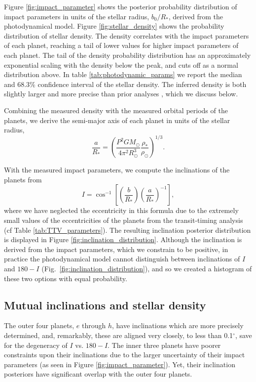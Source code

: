 \documentclass[twocolumn]{aastex63}
\begin{document}
Figure \ref{fig:impact_parameter} shows the posterior probability distribution of impact
parameters in units of the stellar radius, $b_0/R_*$, derived from the photodynamical 
model.  Figure \ref{fig:stellar_density} shows the probability distribution of stellar 
density.  The density correlates with the impact
parameters of each planet, reaching a tail of lower values
for higher impact parameters of each planet.  The tail of the density probability
distribution has an approximately exponential scaling with the density below the
peak, and cuts off as a normal distribution above.  In table \ref{tab:photodynamic_params} 
we report the median and 68.3\% confidence interval
of the stellar density.  The inferred density is both slightly larger and more precise
than prior analyses \citep{Delrez2018a}, which we discuss below.

Combining the measured density with the measured orbital periods of the planets,
we derive the semi-major axis of each planet in units of the stellar radius,
\begin{equation}
    \frac{a}{R_*} = \left(\frac{P^2 G M_\odot}{4\pi^2 R_\odot^3} \frac{\rho_*}{\rho_\odot}\right)^{1/3}.
\end{equation}

With the measured impact parameters, we compute the inclinations of the planets
from
\begin{equation}
    I = \cos^{-1}\left[ \left(\frac{b}{R_*}\right)
    \left(\frac{a}{R_*}\right)^{-1}\right],
\end{equation}
where we have neglected the eccentricity in this formula due to the extremely
small values of the eccentricities of the planets from the transit-timing
analysis (cf Table \ref{tab:TTV_parameters}).  The resulting inclination
posterior distribution is displayed in Figure \ref{fig:inclination_distribution}.  
Although the inclination is derived from the impact parameters, which we constrain 
to be positive, in practice the photodynamical model cannot distinguish between 
inclinations of $I$ and $180-I$ (Fig.\ \ref{fig:inclination_distribution}), and so we created a histogram of these two options 
with equal probability.

\subsection{Mutual inclinations and stellar density}

The outer four planets, $e$ through $h$, have inclinations which are more
precisely determined, and, remarkably, these are aligned
very closely, to less than 0.1$^\circ$, save for the degeneracy of $I$ vs.
$180-I$.  The inner three planets have poorer
constraints upon their inclinations due to the larger uncertainty of their
impact parameters (as seen in Figure \ref{fig:impact_parameter}).  Yet, their inclination posteriors have significant overlap
with the outer four planets.
\end{document}
